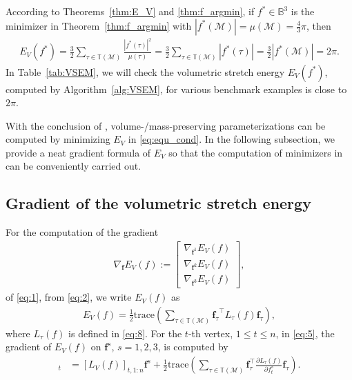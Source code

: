 \documentclass[onefignum,onetabnum]{siamonline220329}
\newcounter{example}
\numberwithin{equation}{section}
\def\f{\mathbf{f}}
\begin{document}
\begin{sloppypar}
\begin{remark} \label{rem:OptVal_Ev}
According to Theorems~\ref{thm:E_V} and \ref{thm:f_argmin}, if $f^{*} \in \mathbb{B}^3$ is the minimizer in Theorem~\ref{thm:f_argmin} with $| f^{*}(\mathcal{M}) | = \mu(\mathcal{M}) = \frac{4}{3} \pi$, then
\begin{align*}
    E_V(f^{*}) = \frac{3}{2} \sum_{\tau\in\mathbb{T}(\mathcal{M})}\frac{ |f^{*}(\tau)|^2}{\mu(\tau)} = \frac{3}{2} \sum_{\tau\in\mathbb{T}(\mathcal{M})} |f^{*}(\tau)| = \frac{3}{2} | f^{*}(\mathcal{M}) | = 2 \pi.
\end{align*}
In Table~\ref{tab:VSEM}, we will check the volumetric stretch energy $E_V(f^{*})$, computed by Algorithm~\ref{alg:VSEM}, for various benchmark examples is close to $2\pi$. 
\end{remark}

With the conclusion of , volume-/mass-preserving parameterizations can be computed by minimizing $E_V$ in \eqref{eq:equ_cond}. In the following subsection, we provide a neat gradient formula of $E_V$ so that the computation of minimizers in  can be conveniently carried out.

\subsection{Gradient of the volumetric stretch energy}
\label{subsec:3.2}

For the computation of the gradient 
\begin{align}
\label{eq:5}
\nabla_{\mathbf{f}}E_V(f):=
\begin{bmatrix}
\nabla_{\mathbf{f}^1}E_V(f)\\
\nabla_{\mathbf{f}^2}E_V(f)\\
\nabla_{\mathbf{f}^3}E_V(f)
\end{bmatrix},
\end{align}
of \eqref{eq:1}, from \eqref{eq:2}, we write $E_V(f)$ as
\begin{align*}
E_V(f)=\frac{1}{2}\mathrm{trace}\left(\sum_{\tau \in \mathbb{T}(\mathcal{M})}{\mathbf{f}_{\tau}}^{\top} L_{\tau}(f)\mathbf{f}_{\tau} \right),
\end{align*}
where $L_{\tau}(f)$ is defined in \eqref{eq:8}.
For the $t$-th vertex, $1\leq t\leq n$,  in \eqref{eq:5}, the gradient of $E_V(f)$ on $\mathbf{f}^s$, $s=1, 2, 3$, is computed by
\begin{align}
[\nabla_{\mathbf{f}^s}E_V(f)]_t 
&=[L_V(f)]_{t,1:n} \f^{s} + %
\frac{1}{2}\mathrm{trace}\left(\sum_{\tau \in \mathbb{T}(\mathcal{M})} \mathbf{f}_{\tau}^{\top}\frac{\partial L_{\tau}(f)}{\partial f_t^s}\mathbf{f}_{\tau} \right).\label{eq:6}
\end{align}


\end{sloppypar}
\end{document}

